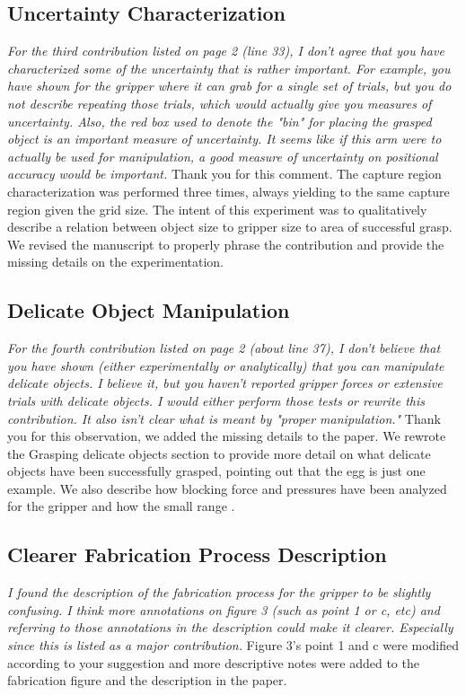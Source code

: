 \documentclass[letterpaper, 10 pt, twocolumn, conference]{article}
\begin{document}
\subsection{Uncertainty Characterization}
\textit{For the third contribution listed on page 2 (line 33), I don't agree that you have characterized some of the uncertainty that is rather important. For example, you have shown for the gripper where it can grab for a single set of trials, but you do not describe repeating those trials, which would actually give you measures of uncertainty. Also, the red box used to denote the "bin" for placing the grasped object is an important measure of uncertainty. It seems like if this arm were to actually be used for manipulation, a good measure of uncertainty on positional accuracy would be important.}
%
Thank you for this comment. The capture region characterization was performed three times, always yielding to the same capture region given the grid size. The intent of this experiment was to qualitatively describe a relation between object size to gripper size to area of successful grasp. 
We revised the manuscript to properly phrase the contribution and provide the missing details on the experimentation.
%
\subsection{Delicate Object Manipulation}
\textit{For the fourth contribution listed on page 2 (about line 37), I don't believe that you have shown (either experimentally or analytically) that you can manipulate delicate objects. I believe it, but you haven't reported gripper forces or extensive trials with delicate objects. I would either perform those tests or rewrite this contribution. It also isn't clear what is meant by "proper manipulation."}
%
Thank you for this observation, we added the missing details to the paper. We rewrote the Grasping delicate objects section to provide more detail on what delicate objects have been successfully grasped, pointing out that the egg is just one example. We also describe how blocking force and pressures have been analyzed for the gripper and how the small range .
%
\subsection{Clearer Fabrication Process Description}
\textit{I found the description of the fabrication process for the gripper to be slightly confusing. I think more annotations on figure 3 (such as point 1 or c, etc) and referring to those annotations in the description could make it clearer. Especially since this is listed as a major contribution.}
%
Figure 3’s point 1 and c were modified according to your suggestion and more descriptive notes were added to the fabrication figure and the description in the paper.
%
\end{document}
